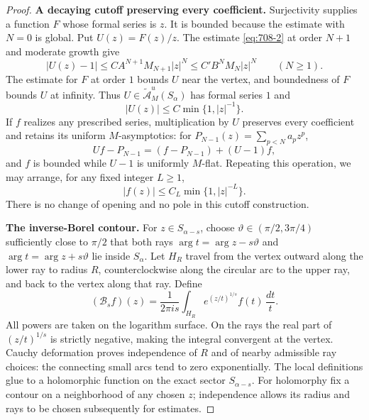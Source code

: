 \documentclass[11pt,a4paper]{article}
\theoremstyle{remark}
\begin{document}
\begin{proof}
\par\smallskip\noindent\textbf{A decaying cutoff preserving every coefficient.}
Surjectivity supplies a function $F$ whose formal series is $z$.
It is bounded because the estimate with $N=0$ is global.
Put $U(z)=F(z)/z$.
The estimate \eqref{eq:708-2} at order $N+1$ and moderate growth give
\[
 |U(z)-1|\le C A^{N+1}M_{N+1}|z|^N
 \le C'B^NM_N|z|^N\qquad(N\ge1).
\]
The estimate for $F$ at order $1$ bounds $U$ near the vertex, and
boundedness of $F$ bounds $U$ at infinity.  Thus
$U\in\widetilde{\mathcal A}^{u}_M(S_\alpha)$ has formal series $1$ and
\begin{equation}
 |U(z)|\le C\min\{1,|z|^{-1}\}.
 \label{eq:708-3}
\end{equation}
If $f$ realizes any prescribed series, multiplication by $U$ preserves
every coefficient and retains its uniform $M$-asymptotics: for
$P_{N-1}(z)=\sum_{p<N}a_pz^p$,
\[
 Uf-P_{N-1}=(f-P_{N-1})+(U-1)f,
\]
and $f$ is bounded while $U-1$ is uniformly $M$-flat.
Repeating this operation, we may arrange, for any fixed integer $L\ge1$,
\begin{equation}
 |f(z)|\le C_L\min\{1,|z|^{-L}\}.
 \label{eq:708-4}
\end{equation}
There is no change of opening and no pole in this cutoff construction.

\par\smallskip\noindent\textbf{The inverse-Borel contour.}
For $z\in S_{\alpha-s}$, choose
$\vartheta\in(\pi/2,3\pi/4)$ sufficiently close to $\pi/2$ that both
rays $\arg t=\arg z-s\vartheta$ and
$\arg t=\arg z+s\vartheta$ lie inside $S_\alpha$.
Let $H_R$ travel from the vertex outward along the lower ray to radius
$R$, counterclockwise along the circular arc to the upper ray, and
back to the vertex along that ray.  Define
\begin{equation}
 (\mathcal B_sf)(z)=\frac1{2\pi i s}
 \int_{H_R}e^{(z/t)^{1/s}}f(t)\,\frac{dt}{t}.
 \label{eq:708-5}
\end{equation}
All powers are taken on the logarithm surface.  On the rays the real
part of $(z/t)^{1/s}$ is strictly negative, making the integral
convergent at the vertex.
Cauchy deformation proves independence of $R$ and of nearby admissible
ray choices: the connecting small arcs tend to zero exponentially.
The local definitions glue to a holomorphic function on the exact
sector $S_{\alpha-s}$.  For holomorphy fix a contour on a neighborhood
of any chosen $z$; independence allows its radius and rays to be
chosen subsequently for estimates.


\end{proof}
\end{document}
